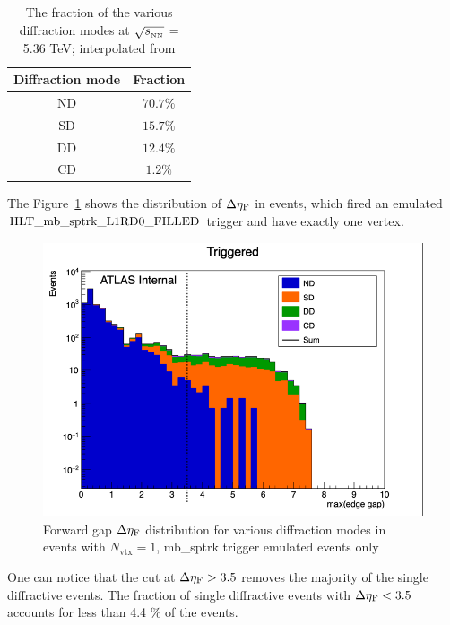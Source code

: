 \begin{table}[h]
    \centering
    \caption{The fraction of the various diffraction modes at $\sqrt{s_{_\text{NN}}}$ = 5.36 TeV; interpolated from \cite{Ciesielski:2012mc}}
    \begin{tabular}{c|c}
    Diffraction mode & Fraction \\
    \hline
    ND & $70.7\%$ \\
    SD & $15.7\%$ \\
    DD & $12.4\%$ \\
    CD & $1.2\%$ \\
    \end{tabular}
    \label{tab:diff_modes}
\end{table}

The Figure~\ref{fig:trigger_diffraction modes} shows the distribution of $\Delta \eta_{\mathrm{F}}$ in events, which fired an emulated $\text{HLT\_mb\_sptrk\_L1RD0\_FILLED}$ trigger and have exactly one vertex. 

\begin{figure}[h]
    \centering
    \includegraphics[width=0.7\linewidth]{images/gap_triggered_nv1.png}
    \caption{Forward gap $\Delta \eta_{\mathrm{F}}$ distribution for various diffraction modes in events with $N_\text{vtx} = 1$, mb\_sptrk trigger emulated events only}
    \label{fig:trigger_diffraction modes}
\end{figure}


One can notice that the cut at $\Delta \eta_{\mathrm{F}} > 3.5$ removes the majority of the single diffractive events. The fraction of single diffractive events with $\Delta \eta_{\mathrm{F}} < 3.5$ accounts for less than 4.4 \% of the events. 

 \black{} 